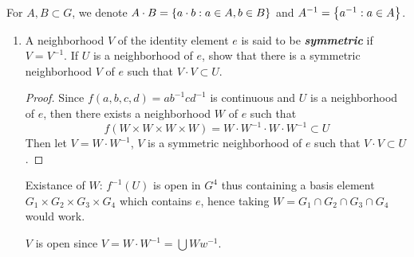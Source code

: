 \documentclass[12pt,a4paper]{article}
\begin{document}
    \begin{ex}
        For $A,B\subset G$, we denote $A\cdot B=\left\{a\cdot b:a\in A,b\in B\right\}$ and $A^{-1}=\left\{a^{-1}:a\in A\right\}$.
        \begin{enumerate}\label{2.11.6}
            \item A neighborhood $V$ of the identity element $e$ is said to be \textbf{\textit{symmetric}} if $V=V^{-1}$. If $U$ is a neighborhood of $e$, show that there is a symmetric neighborhood $V$ of $e$ such that $V\cdot V\subset U$.
            \begin{proof}
                 Since $f(a,b,c,d)=ab^{-1}cd^{-1}$ is continuous and $U$ is a neighborhood of $e$, then there exists a neighborhood $W$ of $e$ such that 
                 $$
                 f(W\times W\times W\times W)=W\cdot W^{-1}\cdot W\cdot W^{-1}\subset U
                 $$
                 Then let $V=W\cdot W^{-1}$, $V$ is a symmetric neighborhood of $e$ such that $V\cdot V\subset U$.
            \end{proof}
            \begin{remark}
                Existance of $W$: $f^{-1}(U)$ is open in $G^4$ thus containing a basis element $G_1\times G_2\times G_3\times G_4$ which contains $e$, hence taking $W=G_1\cap G_2\cap G_3\cap G_4$ would work. 
            \end{remark}
            \begin{remark}
                $V$ is open since $V=W\cdot W^{-1}=\bigcup Ww^{-1}$.
            \end{remark}
            

\end{enumerate}
\end{ex}
\end{document}
